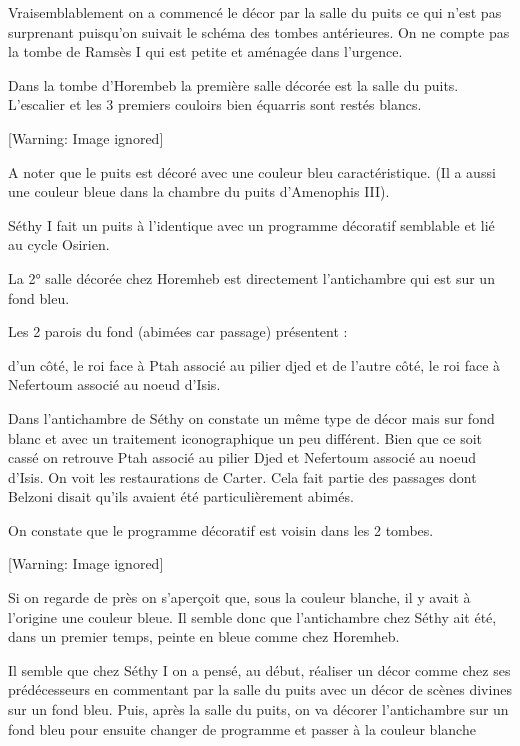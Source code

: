 \documentclass{article}
\begin{document}
Vraisemblablement on a commencé le décor par la salle du puits ce qui
n’est pas surprenant puisqu’on suivait le schéma des tombes
antérieures. On ne compte pas la tombe de Ramsès I qui est petite et
aménagée dans l’urgence. 

Dans la tombe d’Horembeb la première salle décorée est la salle du
puits. L’escalier et les 3 premiers couloirs bien équarris sont restés
blancs. 

  [Warning: Image ignored] %
 

A noter que le puits est décoré avec une couleur bleu caractéristique.
(Il a aussi une couleur bleue dans la chambre du puits d’Amenophis
III).

Séthy I fait un puits à l’identique  avec un programme décoratif
semblable et lié au cycle Osirien.

La 2° salle décorée chez Horemheb est directement l’antichambre qui est
sur un fond bleu. 

Les 2 parois du fond (abimées car passage) présentent :

d’un côté, le roi face à Ptah associé au pilier djed et de l’autre côté,
le roi face à Nefertoum associé au noeud d’Isis.

Dans l’antichambre de Séthy on constate un même type de décor mais sur
fond blanc et avec un traitement iconographique un peu différent. Bien
que ce soit cassé on retrouve Ptah associé au pilier Djed et  Nefertoum
associé au noeud d’Isis. On voit les restaurations de Carter. Cela fait
partie des passages dont Belzoni disait qu’ils avaient été
particulièrement abimés. 

On constate que le programme décoratif est voisin dans les 2 tombes.

  [Warning: Image ignored] %
 

Si on regarde de près on s’aperçoit que, sous la couleur blanche, il y
avait à l’origine une couleur bleue. Il semble donc que l’antichambre
chez Séthy ait été, dans un premier temps, peinte en bleue comme chez
Horemheb. 

Il semble que chez Séthy I on a pensé, au début, réaliser un décor comme
chez ses prédécesseurs en commentant par la salle du puits avec un
décor de scènes divines sur un fond bleu. Puis, après la salle du
puits, on va décorer l’antichambre sur un fond bleu pour ensuite
changer de programme et passer à la couleur blanche
\end{document}
